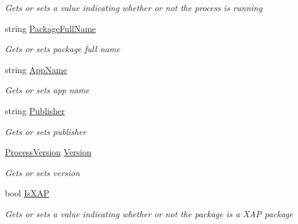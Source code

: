 \begin{DoxyCompactItemize}
\begin{DoxyCompactList}\small\item\em Gets or sets a value indicating whether or not the process is running \end{DoxyCompactList}\item 
string \hyperlink{class_microsoft_1_1_tools_1_1_windows_device_portal_1_1_device_portal_1_1_process_info_a66aa0cfcd4f2ba3d58fc5915d9599572}{Package\+Full\+Name}
\begin{DoxyCompactList}\small\item\em Gets or sets package full name \end{DoxyCompactList}\item 
string \hyperlink{class_microsoft_1_1_tools_1_1_windows_device_portal_1_1_device_portal_1_1_process_info_af43620a045970115d2d969bdd5f3f8e7}{App\+Name}
\begin{DoxyCompactList}\small\item\em Gets or sets app name \end{DoxyCompactList}\item 
string \hyperlink{class_microsoft_1_1_tools_1_1_windows_device_portal_1_1_device_portal_1_1_process_info_a74700f290912b8863fd63a94032a1057}{Publisher}
\begin{DoxyCompactList}\small\item\em Gets or sets publisher \end{DoxyCompactList}\item 
\hyperlink{class_microsoft_1_1_tools_1_1_windows_device_portal_1_1_device_portal_1_1_process_version}{Process\+Version} \hyperlink{class_microsoft_1_1_tools_1_1_windows_device_portal_1_1_device_portal_1_1_process_info_a6d6daa1d649e34152505c131e37115da}{Version}
\begin{DoxyCompactList}\small\item\em Gets or sets version \end{DoxyCompactList}\item 
bool \hyperlink{class_microsoft_1_1_tools_1_1_windows_device_portal_1_1_device_portal_1_1_process_info_a42a6c4fd4b9737935be305c70407e5dd}{Is\+X\+AP}
\begin{DoxyCompactList}\small\item\em Gets or sets a value indicating whether or not the package is a X\+AP package \end{DoxyCompactList}\end{DoxyCompactItemize}


